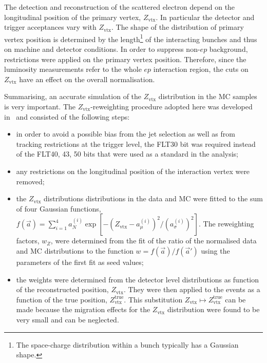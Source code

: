 The detection and reconstruction of the scattered electron depend on the longitudinal position of the primary vertex, $Z_\text{vtx}$. In particular the detector and trigger acceptances vary with $Z_\text{vtx}$. The shape of the distribution of primary vertex position is determined by the length\footnote{The space-charge distribution within a bunch typically has a Gaussian shape.} of the interacting bunches and thus on machine and detector conditions. In order to suppress non-$ep$ background, restrictions were applied on the primary vertex position. Therefore, since the luminosity measurements refer to the whole $ep$ interaction region, the cuts on $Z_\text{vtx}$ have an effect on the overall normalisation. 

Summarising, an accurate simulation of the $Z_\text{vtx}$ distribution in the MC samples is very important. The $Z_\text{vtx}$-reweighting procedure adopted here was developed in~\cite{joerg} and consisted of the following steps:
\begin{itemize}
 \item in order to avoid a possible bias from the jet selection as well as from tracking restrictions at the trigger level, the FLT30 bit was required instead of the FLT40, 43, 50 bits that were used as a standard in the analysis;
 \item any restrictions on the longitudinal position of the interaction vertex were removed;
 \item the $Z_\text{vtx}$ distributions distributions in the data and MC were fitted to the sum of four Gaussian functions, $f\left(\vec a\right)=\sum_{i=1}^4{a_N^{\left(i\right)}\exp{\left[-\left(Z_\text{vtx}-a_{\mu}^{\left(i\right)}\right)^2/\left(a_\sigma^{\left(i\right)}\right)^2\right]}}$. The reweighting factors, $w_{Z}$, were determined from the fit of the ratio of the normalised data and MC distributions to the function $w=f\left(\vec a\right)/f\left(\vec a'\right)$ using the parameters of the first fit as seed values;
 \item the weights were determined from the detector level distributions as function of the reconstructed position, $Z_\text{vtx}$. They were then applied to the events as a function of the true position, $Z_\text{vtx}^\text{true}$. This substitution $Z_\text{vtx} \mapsto Z_\text{vtx}^\text{true}$ can be made because the migration effects for the $Z_\text{vtx}$ distribution were found to be very small and can be neglected.
\end{itemize}

